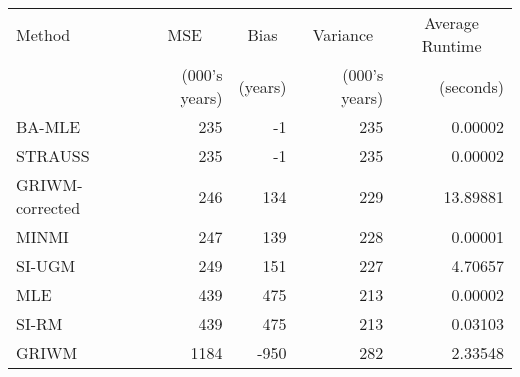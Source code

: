 
\begin{tabular}{lrrrr}
\toprule
\multicolumn{1}{l}{Method} & \multicolumn{1}{c}{MSE} & \multicolumn{1}{c}{Bias} & \multicolumn{1}{c}{Variance} & \multicolumn{1}{c}{Average Runtime} \\
 & (000's years) & (years) & (000's years) & (seconds)\\
\midrule
BA-MLE & 235 & -1 & 235 & 0.00002\\
STRAUSS & 235 & -1 & 235 & 0.00002\\
GRIWM-corrected & 246 & 134 & 229 & 13.89881\\
MINMI & 247 & 139 & 228 & 0.00001\\
SI-UGM & 249 & 151 & 227 & 4.70657\\
\addlinespace
MLE & 439 & 475 & 213 & 0.00002\\
SI-RM & 439 & 475 & 213 & 0.03103\\
GRIWM & 1184 & -950 & 282 & 2.33548\\
\bottomrule
\end{tabular}
